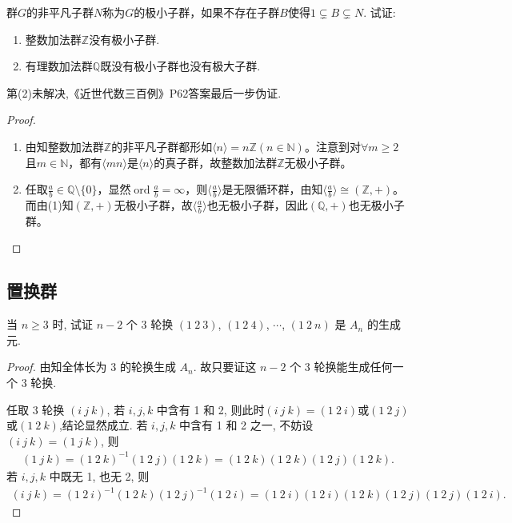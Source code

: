 \documentclass[../../main.tex]{subfiles}%
\begin{document}
\begin{example}
群$G$的非平凡子群$N$称为$G$的极小子群，如果不存在子群$B$使得$1 \subsetneq B \subsetneq N$. 试证:
\begin{enumerate}[(1)]
\item 整数加法群$\mathbb{Z}$没有极小子群.

\item 有理数加法群$\mathbb{Q}$既没有极小子群也没有极大子群.
\end{enumerate}
\end{example}
\begin{remark}
第(2)未解决,《近世代数三百例》P62答案最后一步伪证.
\end{remark}
\begin{proof}
\begin{enumerate}[(1)]
\item 由知整数加法群$\mathbb{Z}$的非平凡子群都形如$\langle n \rangle =n\mathbb{Z} \left( n\in \mathbb{N} \right)$。注意到对$\forall m\geqslant 2$且$m\in \mathbb{N}$，都有$\langle mn \rangle$是$\langle n \rangle$的真子群，故整数加法群$\mathbb{Z}$无极小子群。

\item 任取$\frac{a}{b}\in \mathbb{Q} \setminus \{ 0 \}$，显然$\operatorname{ord}\frac{a}{b}=\infty$，则$\langle \frac{a}{b} \rangle$是无限循环群，由知$\langle \frac{a}{b} \rangle \cong (\mathbb{Z},+)$。而由(1)知$(\mathbb{Z},+)$无极小子群，故$\langle \frac{a}{b} \rangle$也无极小子群，因此$(\mathbb{Q},+)$也无极小子群。


\end{enumerate}

\end{proof}



\subsection{置换群}

\begin{example}
当 $n\geqslant 3$ 时, 试证 $n-2$ 个 3 轮换 $(1\ 2\ 3)$, $(1\ 2\ 4)$, $\cdots$, $(1\ 2\ n)$ 是 $A_n$ 的生成元.
\end{example}
\begin{proof}

由知全体长为 3 的轮换生成 $A_n$. 故只要证这 $n-2$ 个 3 轮换能生成任何一个 3 轮换.

任取 3 轮换 $(i\ j\ k)$, 若 $i,j,k$ 中含有 1 和 2, 则此时$(i\ j\ k)=(1\ 2\ i)$或$(1\ 2\ j)$或$(1\ 2\ k)$,结论显然成立. 若 $i,j,k$ 中含有 1 和 2 之一, 不妨设 $(i\ j\ k)=(1\ j\ k)$, 则
\begin{align*}
(1\ j\ k)=(1\ 2\ k)^{-1}(1\ 2\ j)(1\ 2\ k)=(1\ 2\ k)(1\ 2\ k)(1\ 2\ j)(1\ 2\ k).
\end{align*}
若 $i,j,k$ 中既无 1, 也无 2, 则
\begin{align*}
(i\ j\ k)=(1\ 2\ i)^{-1}(1\ 2\ k)(1\ 2\ j)^{-1}(1\ 2\ i)=(1\ 2\ i)(1\ 2\ i)(1\ 2\ k)(1\ 2\ j)(1\ 2\ j)(1\ 2\ i).
\end{align*}

\end{proof}
\end{document}
